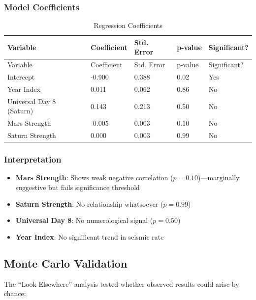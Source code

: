 \documentclass[
  11pt,
  a4paper,
  oneside,
  openany]{article}
\providecommand{\tightlist}{%
  \setlength{\itemsep}{0pt}\setlength{\parskip}{0pt}}\usepackage{longtable,booktabs,array}
\begin{document}
\subsubsection{Model Coefficients}\label{model-coefficients}

\begin{longtable}[]{@{}lllll@{}}
\caption{Regression Coefficients}\label{tbl-regression}\tabularnewline
\toprule\noalign{}
Variable & Coefficient & Std. Error & p-value & Significant? \\
\midrule\noalign{}
\endfirsthead
\toprule\noalign{}
Variable & Coefficient & Std. Error & p-value & Significant? \\
\midrule\noalign{}
\endhead
\bottomrule\noalign{}
\endlastfoot
Intercept & -0.900 & 0.388 & 0.02 & Yes \\
Year Index & 0.011 & 0.062 & 0.86 & No \\
Universal Day 8 (Saturn) & 0.143 & 0.213 & 0.50 & No \\
Mars Strength & -0.005 & 0.003 & 0.10 & No \\
Saturn Strength & 0.000 & 0.003 & 0.99 & No \\
\end{longtable}

\subsubsection{Interpretation}\label{interpretation}

\begin{itemize}
\tightlist
\item
  \textbf{Mars Strength}: Shows weak negative correlation
  (\(p = 0.10\))---marginally suggestive but fails significance
  threshold
\item
  \textbf{Saturn Strength}: No relationship whatsoever (\(p = 0.99\))
\item
  \textbf{Universal Day 8}: No numerological signal (\(p = 0.50\))
\item
  \textbf{Year Index}: No significant trend in seismic rate
\end{itemize}

\subsection{Monte Carlo Validation}\label{monte-carlo-validation}

The ``Look-Elsewhere'' analysis tested whether observed results could
arise by chance:
\end{document}
